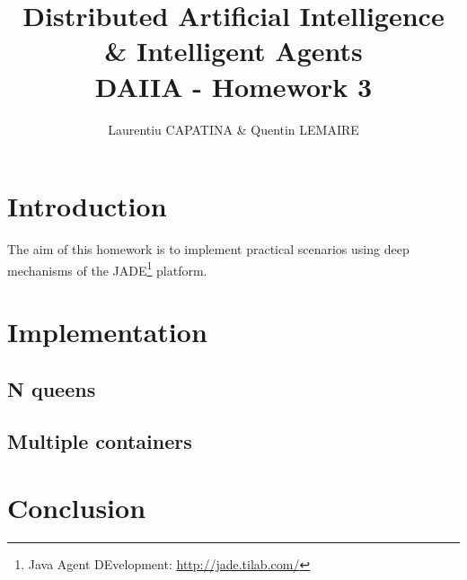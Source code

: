 \documentclass[a4paper,11pt]{article}
\title{Distributed Artificial Intelligence \& Intelligent Agents \\ DAIIA - Homework 3}
\author{Laurentiu CAPATINA \& Quentin LEMAIRE}
\begin{document}
  \maketitle %

  \section{Introduction}
  
  The aim of this homework is to implement practical scenarios using deep 
mechanisms of the JADE\footnote{Java Agent DEvelopment: \href{http://jade.tilab.com/}{http://jade.tilab.com/}} 
  platform. 


  \newcommand{\pa}{\textit{Profiler Agent}}
  \newcommand{\cu}{\textit{Curator Agent}}
  \renewcommand{\to}{\textit{Tour Guide Agent}}
  \newcommand{\am}{\textit{Artist Manager Agent}}
  
  \section{Implementation}
  
  \subsection{N queens}


  \subsection{Multiple containers}


  \section{Conclusion}
  
\end{document}

